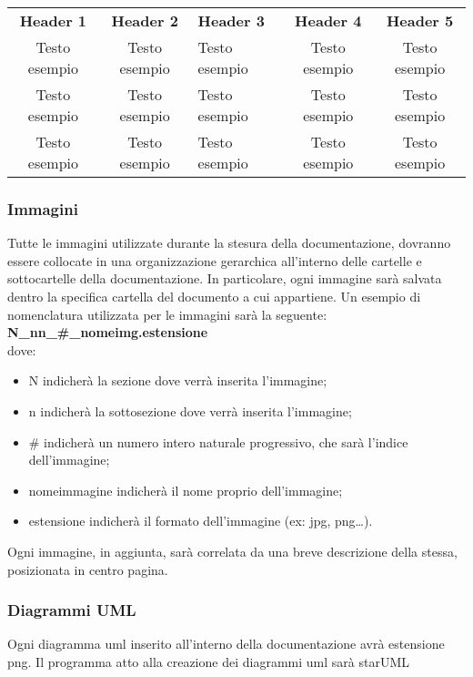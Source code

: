    \renewcommand{\arraystretch}{1.5}
    \begin{longtable}{ c c  C{4cm}  c  c }
        \rowcolor{\primaryColor}
        \textcolor{\secondaryColor}{
		\centering\textbf{Header 1}}     & \textcolor{\secondaryColor}{\centering\textbf{Header 2}}       & \centering\textcolor{\secondaryColor}
        {\centering\textbf{Header 3}} & \textcolor{\secondaryColor}{\centering\textbf{Header 4}} & \textcolor{\secondaryColor}{\centering\textbf{Header 5}}                          \\
        Testo esempio                 & Testo esempio                                    & Testo esempio                                & Testo esempio & Testo esempio{} \\
        Testo esempio                & Testo esempio                                    & Testo esempio                                   & Testo esempio & Testo esempio{} \\
        Testo esempio                & Testo esempio                                    & Testo esempio                          & Testo esempio & Testo esempio{}    \\
    \end{longtable}


\subsubsection{Immagini}
Tutte le immagini utilizzate durante la stesura della documentazione, dovranno essere collocate in una organizzazione gerarchica all’interno delle cartelle e sottocartelle della documentazione. In particolare, ogni immagine sarà salvata dentro la specifica cartella del documento a cui appartiene. Un esempio di nomenclatura utilizzata per le immagini sarà la seguente:
\textbf{N\_nn\_\#\_nomeimg.estensione}\\
dove:
\begin{itemize}
	\item N indicherà la sezione dove verrà inserita l’immagine;
	\item n indicherà la sottosezione dove verrà inserita l’immagine;
	\item \# indicherà un numero intero naturale progressivo, che sarà l’indice dell’immagine;
	\item nomeimmagine indicherà il nome proprio dell’immagine;
	\item estensione indicherà il formato dell’immagine (ex: jpg, png…).
\end{itemize}
Ogni immagine, in aggiunta, sarà correlata da una breve descrizione della stessa, posizionata in centro pagina.

\subsubsection{Diagrammi UML}
Ogni diagramma uml inserito all’interno della documentazione avrà estensione png. Il programma atto alla creazione dei diagrammi uml sarà starUML






